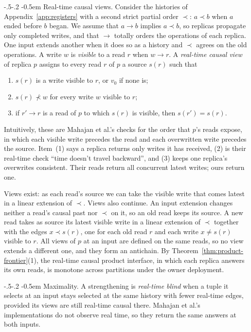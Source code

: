 \documentclass[sigconf]{cidr-2027}
\makeatletter
\theoremstyle{remark}
\renewcommand\paragraph{\@startsection{paragraph}{4}{\z@}%
  {-.5\baselineskip \@plus -2\p@ \@minus -.2\p@}%
  {-0.5em}%
  {\normalfont\bfseries}}
\newcommand{\inrel}{extends\xspace}          %
\newcommand{\indesc}{input extension\xspace} %
\makeatother
\begin{document}
\paragraph{Real-time causal views.}
\color{blue!70!black}Consider the histories of Appendix~\ref{app:registers} with a second strict
partial order $\prec$: $a\prec b$ when $a$ ended before $b$ began.  We assume
that $a\to b$ implies $a\prec b$, so replicas propagate only completed writes,
and that $\to$ totally orders the operations of each replica.  One input
\inrel another when it does so as a history and $\prec$ agrees on the old
operations.  A write $w$ is \emph{visible} to a read $r$ when $w\to r$.  A
\emph{real-time causal view} of replica $p$ assigns to every read $r$ of $p$ a
source $s(r)$ such that
\begin{enumerate}
  \item $s(r)$ is a write visible to $r$, or $v_0$ if none is;
  \item $s(r)\not\prec w$ for every write $w$ visible to $r$;
  \item if $r'\to r$ is a read of $p$ to which $s(r)$ is visible, then
        $s(r')=s(r)$.
\end{enumerate}
Intuitively, these are Mahajan et al.'s checks for the order that $p$'s reads expose, in
which each visible write precedes the read and each overwritten write
precedes the source.  Item~(1) says a replica returns only writes it has
received, (2) is their real-time check ``time doesn't travel backward'', and
(3) keeps one replica's overwrites consistent.  Their reads return all
concurrent latest writes; ours return one.\color{black}

\color{blue!70!black}Views exist: as each read's source we can take the visible write that comes
latest in a linear extension of $\prec$.  Views also continue.  An \indesc
changes neither a read's causal past nor $\prec$ on it, so an old read keeps its
source.  A new read takes as source its latest visible write in a linear
extension of $\prec$ together with the edges $x\prec s(r)$, one for each old
read $r$ and each write $x\ne s(r)$ visible to $r$.  All views of $p$ at an
input are defined on the same reads, so no view extends a different one, and
they form an antichain.  By Theorem~\ref{thm:product-frontier}(1), the real-time causal
product interface, in which each replica answers its own reads, is monotone
across partitions under the owner deployment.\color{black}

\paragraph{Maximality.}
A strengthening is \emph{real-time blind} when a tuple it selects at an input
stays selected at the same history with fewer real-time edges, provided its
views are still real-time causal there.  Mahajan et al.'s implementations do
not observe real time, so they return the same answers at both inputs.
\end{document}
